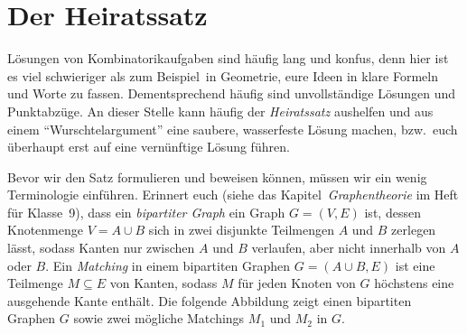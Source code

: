 \section{Der Heiratssatz}\label{kapitel:Heiratssatz}
Lösungen von Kombinatorikaufgaben sind häufig lang und konfus, denn hier ist es viel schwieriger als zum Beispiel\ in Geometrie, eure Ideen in klare Formeln und Worte zu fassen. Dementsprechend häufig sind unvollständige Lösungen und Punktabzüge. An dieser Stelle kann häufig der \emph{Heiratssatz} aushelfen und aus einem \enquote{Wurschtelargument} eine saubere, wasserfeste Lösung machen, bzw.\ euch überhaupt erst auf eine vernünftige Lösung führen.

Bevor wir den Satz formulieren und beweisen können, müssen wir ein wenig Terminologie einführen. Erinnert euch (siehe das Kapitel~\emph{Graphentheorie} im Heft für Klasse~9), dass ein \emph{bipartiter Graph} ein Graph $G=(V,E)$ ist, dessen Knotenmenge $V=A\cup B$ sich in zwei disjunkte Teilmengen $A$ und $B$ zerlegen lässt, sodass Kanten nur zwischen $A$ und $B$ verlaufen, aber nicht innerhalb von $A$ oder $B$. Ein \emph{Matching} in einem bipartiten Graphen $G=(A\cup B, E)$ ist eine Teilmenge $M\subseteq E$ von Kanten, sodass $M$ für jeden Knoten von $G$ höchstens eine ausgehende Kante enthält. Die folgende Abbildung zeigt einen bipartiten Graphen $G$ sowie zwei mögliche Matchings $M_1$ und $M_2$ in $G$.

